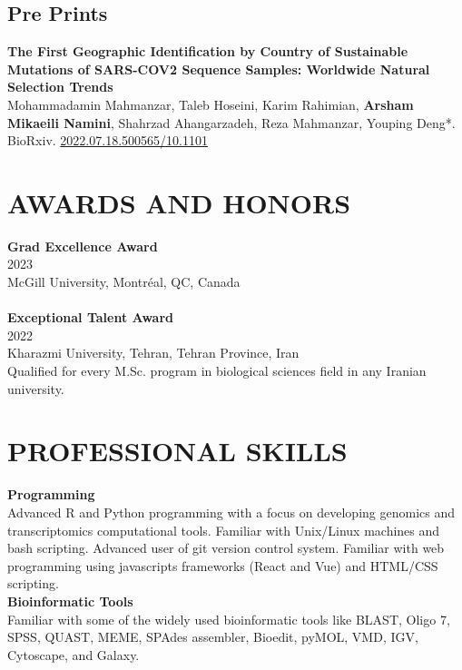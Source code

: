 \documentclass[a4paper,9pt]{extarticle}
\begin{document}
\subsection*{Pre Prints}
\textbf{The First Geographic Identification by Country of Sustainable Mutations of SARS-COV2 Sequence Samples: Worldwide Natural Selection Trends} \\
Mohammadamin Mahmanzar, Taleb Hoseini, Karim Rahimian, \textbf{Arsham Mikaeili Namini}, Shahrzad Ahangarzadeh, Reza Mahmanzar, Youping Deng*. BioRxiv. \href{https://doi.org/10.1101/2022.07.18.500565}{2022.07.18.500565/10.1101}


\section*{AWARDS AND HONORS}

\noindent
\newline
\textbf{Grad Excellence Award} \\
2023 \\
McGill University, Montréal, QC, Canada \\
\\
\noindent
\textbf{ Exceptional Talent Award} \\
2022 \\
Kharazmi University, Tehran, Tehran Province, Iran \\
Qualified for every M.Sc. program in biological sciences field in any Iranian university.  \\



\section*{PROFESSIONAL SKILLS}

\noindent
\newline
\textbf{Programming} \\
Advanced R and Python programming with a focus on developing genomics and transcriptomics computational tools. Familiar with Unix/Linux machines and bash scripting. Advanced user of git version control system. Familiar with web programming using javascripts frameworks (React and Vue) and HTML/CSS scripting.\\

\noindent
\textbf{Bioinformatic Tools} \\
Familiar with some of the widely used bioinformatic tools like BLAST, Oligo 7, SPSS, QUAST, MEME, SPAdes assembler, Bioedit, pyMOL, VMD, IGV, Cytoscape, and Galaxy.  \\
\end{document}
